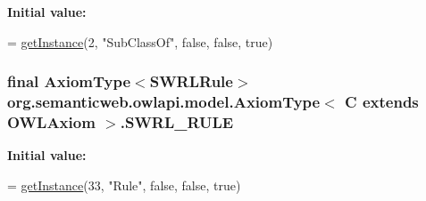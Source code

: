 {\bfseries Initial value\-:}
\begin{DoxyCode}
= \hyperlink{classorg_1_1semanticweb_1_1owlapi_1_1model_1_1_axiom_type_3_01_c_01extends_01_o_w_l_axiom_01_4_a485e011845434c518471707a87f09339}{getInstance}(2,
            \textcolor{stringliteral}{"SubClassOf"}, \textcolor{keyword}{false}, \textcolor{keyword}{false}, \textcolor{keyword}{true})
\end{DoxyCode}
\hypertarget{classorg_1_1semanticweb_1_1owlapi_1_1model_1_1_axiom_type_3_01_c_01extends_01_o_w_l_axiom_01_4_a19c291ad3ef08b79ea837fc47093aefe}{
\subsubsection[{S\-W\-R\-L\-\_\-\-R\-U\-L\-E}]{\setlength{\rightskip}{0pt plus 5cm}final {\bf Axiom\-Type}$<${\bf S\-W\-R\-L\-Rule}$>$ org.\-semanticweb.\-owlapi.\-model.\-Axiom\-Type$<$ C extends {\bf O\-W\-L\-Axiom} $>$.S\-W\-R\-L\-\_\-\-R\-U\-L\-E\hspace{0.3cm}{\ttfamily [static]}}}\label{classorg_1_1semanticweb_1_1owlapi_1_1model_1_1_axiom_type_3_01_c_01extends_01_o_w_l_axiom_01_4_a19c291ad3ef08b79ea837fc47093aefe}
{\bfseries Initial value\-:}
\begin{DoxyCode}
= \hyperlink{classorg_1_1semanticweb_1_1owlapi_1_1model_1_1_axiom_type_3_01_c_01extends_01_o_w_l_axiom_01_4_a485e011845434c518471707a87f09339}{getInstance}(33, \textcolor{stringliteral}{"Rule"}, \textcolor{keyword}{false},
            \textcolor{keyword}{false}, \textcolor{keyword}{true})
\end{DoxyCode}
